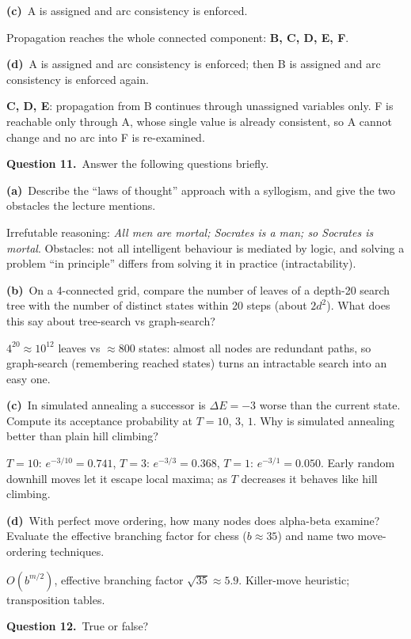 \documentclass[11pt,a4paper]{article}
\newcommand{\question}[1]{\par\medskip\noindent\textbf{Question #1.}\ }
\newcommand{\subq}[1]{\par\smallskip\noindent\textbf{#1}\ }
\begin{document}
\subq{(c)}A is assigned and arc consistency is enforced.
\begin{solbox}
Propagation reaches the whole connected component: \textbf{B, C, D, E, F}.
\end{solbox}
\subq{(d)}A is assigned and arc consistency is enforced; then B is assigned and arc consistency is enforced again.
\begin{solbox}
\textbf{C, D, E}: propagation from B continues through unassigned variables only. F is reachable only through A, whose single value is already consistent, so A cannot change and no arc into F is re-examined.
\end{solbox}
\question{11}Answer the following questions briefly.
\subq{(a)}Describe the ``laws of thought'' approach with a syllogism, and give the two obstacles the lecture mentions.
\begin{solbox}
Irrefutable reasoning: \emph{All men are mortal; Socrates is a man; so Socrates is mortal}. Obstacles: not all intelligent behaviour is mediated by logic, and solving a problem ``in principle'' differs from solving it in practice (intractability).
\end{solbox}
\subq{(b)}On a 4-connected grid, compare the number of leaves of a depth-20 search tree with the number of distinct states within 20 steps (about $2d^2$). What does this say about tree-search vs graph-search?
\begin{solbox}
$4^{20}\approx10^{12}$ leaves vs $\approx800$ states: almost all nodes are redundant paths, so graph-search (remembering reached states) turns an intractable search into an easy one.
\end{solbox}
\subq{(c)}In simulated annealing a successor is $\Delta E=-3$ worse than the current state. Compute its acceptance probability at $T=10$, $3$, $1$. Why is simulated annealing better than plain hill climbing?
\begin{solbox}
$T=10$: $e^{-3/10}=0.741$, $T=3$: $e^{-3/3}=0.368$, $T=1$: $e^{-3/1}=0.050$. Early random downhill moves let it escape local maxima; as $T$ decreases it behaves like hill climbing.
\end{solbox}
\subq{(d)}With perfect move ordering, how many nodes does alpha-beta examine? Evaluate the effective branching factor for chess ($b\approx35$) and name two move-ordering techniques.
\begin{solbox}
$O(b^{m/2})$, effective branching factor $\sqrt{35}\approx5.9$. Killer-move heuristic; transposition tables.
\end{solbox}
\question{12}True or false?
\end{document}
